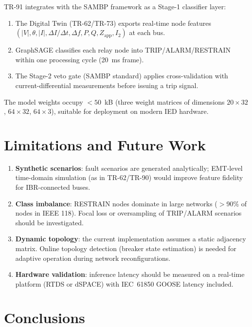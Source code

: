 \documentclass[11pt,a4paper]{article}
\begin{document}
TR-91 integrates with the SAMBP framework as a Stage-1 classifier layer:
\begin{enumerate}
  \item The Digital Twin (TR-62/TR-73) exports real-time node features
        $(|V|, \theta, |I|, \Delta I/\Delta t, \Delta f, P, Q, Z_\text{app},
        I_2)$ at each bus.
  \item GraphSAGE classifies each relay node into TRIP/ALARM/RESTRAIN
        within one processing cycle (20~ms frame).
  \item The Stage-2 veto gate (SAMBP standard) applies cross-validation
        with current-differential measurements before issuing a trip signal.
\end{enumerate}

The model weights occupy $< 50$~kB (three weight matrices of dimensions
$20\times32$, $64\times32$, $64\times3$), suitable for deployment on
modern IED hardware.

\section{Limitations and Future Work}
\label{sec:limitations}

\begin{enumerate}
  \item \textbf{Synthetic scenarios}: fault scenarios are generated
        analytically; EMT-level time-domain simulation (as in TR-62/TR-90)
        would improve feature fidelity for IBR-connected buses.
  \item \textbf{Class imbalance}: RESTRAIN nodes dominate in large networks
        ($>$90\% of nodes in IEEE 118).  Focal loss or oversampling of
        TRIP/ALARM scenarios should be investigated.
  \item \textbf{Dynamic topology}: the current implementation assumes a
        static adjacency matrix.  Online topology detection (breaker state
        estimation) is needed for adaptive operation during network
        reconfigurations.
  \item \textbf{Hardware validation}: inference latency should be measured
        on a real-time platform (RTDS or dSPACE) with IEC~61850 GOOSE latency
        included.
\end{enumerate}

\section{Conclusions}
\label{sec:conclusions}
\end{document}
